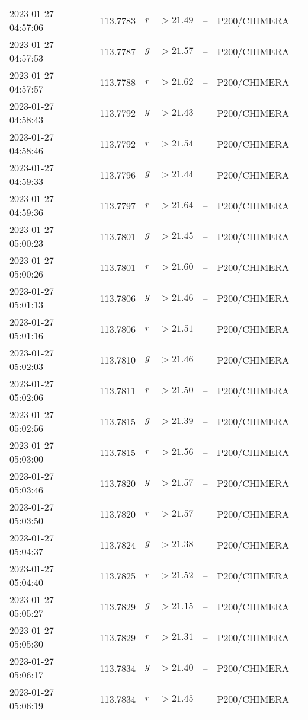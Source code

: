 \documentclass{nature_plusfigure}
\begin{document}
\begin{supplement}
\begin{center}
\begin{longtable}{lllllll}
2023-01-27 04:57:06 & 113.7783 & $r$ & $>21.49$ & -- & P200/CHIMERA &  \\ 
2023-01-27 04:57:53 & 113.7787 & $g$ & $>21.57$ & -- & P200/CHIMERA &  \\ 
2023-01-27 04:57:57 & 113.7788 & $r$ & $>21.62$ & -- & P200/CHIMERA &  \\ 
2023-01-27 04:58:43 & 113.7792 & $g$ & $>21.43$ & -- & P200/CHIMERA &  \\ 
2023-01-27 04:58:46 & 113.7792 & $r$ & $>21.54$ & -- & P200/CHIMERA &  \\ 
2023-01-27 04:59:33 & 113.7796 & $g$ & $>21.44$ & -- & P200/CHIMERA &  \\ 
2023-01-27 04:59:36 & 113.7797 & $r$ & $>21.64$ & -- & P200/CHIMERA &  \\ 
2023-01-27 05:00:23 & 113.7801 & $g$ & $>21.45$ & -- & P200/CHIMERA &  \\ 
2023-01-27 05:00:26 & 113.7801 & $r$ & $>21.60$ & -- & P200/CHIMERA &  \\ 
2023-01-27 05:01:13 & 113.7806 & $g$ & $>21.46$ & -- & P200/CHIMERA &  \\ 
2023-01-27 05:01:16 & 113.7806 & $r$ & $>21.51$ & -- & P200/CHIMERA &  \\ 
2023-01-27 05:02:03 & 113.7810 & $g$ & $>21.46$ & -- & P200/CHIMERA &  \\ 
2023-01-27 05:02:06 & 113.7811 & $r$ & $>21.50$ & -- & P200/CHIMERA &  \\ 
2023-01-27 05:02:56 & 113.7815 & $g$ & $>21.39$ & -- & P200/CHIMERA &  \\ 
2023-01-27 05:03:00 & 113.7815 & $r$ & $>21.56$ & -- & P200/CHIMERA &  \\ 
2023-01-27 05:03:46 & 113.7820 & $g$ & $>21.57$ & -- & P200/CHIMERA &  \\ 
2023-01-27 05:03:50 & 113.7820 & $r$ & $>21.57$ & -- & P200/CHIMERA &  \\ 
2023-01-27 05:04:37 & 113.7824 & $g$ & $>21.38$ & -- & P200/CHIMERA &  \\ 
2023-01-27 05:04:40 & 113.7825 & $r$ & $>21.52$ & -- & P200/CHIMERA &  \\ 
2023-01-27 05:05:27 & 113.7829 & $g$ & $>21.15$ & -- & P200/CHIMERA &  \\ 
2023-01-27 05:05:30 & 113.7829 & $r$ & $>21.31$ & -- & P200/CHIMERA &  \\ 
2023-01-27 05:06:17 & 113.7834 & $g$ & $>21.40$ & -- & P200/CHIMERA &  \\ 
2023-01-27 05:06:19 & 113.7834 & $r$ & $>21.45$ & -- & P200/CHIMERA &  \\ 

\end{longtable}
\end{center}
\end{supplement}
\end{document}
